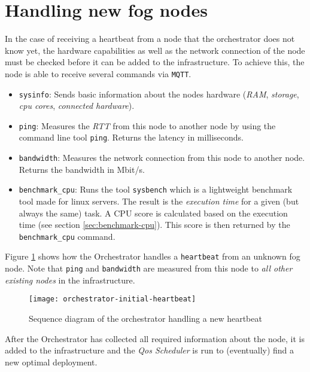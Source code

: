 \section{Handling new fog nodes\label{sec:handling-new-fog-nodes}}

In the case of receiving a heartbeat from a node that the orchestrator does not know yet, the hardware capabilities as well as the network connection of the node must be checked before it can be added to the infrastructure. To achieve this, the node is able to receive several commands via \texttt{MQTT}.

\begin{itemize}
    \item \texttt{sysinfo}: Sends basic information about the nodes hardware (\textit{RAM}, \textit{storage}, \textit{cpu cores}, \textit{connected hardware}).
    \item \texttt{ping}: Measures the \textit{RTT} from this node to another node by using the command line tool \texttt{ping}. Returns the latency in milliseconds.
    \item \texttt{bandwidth}: Measures the network connection from this node to another node. Returns the bandwidth in Mbit/s.
    \item \texttt{benchmark\_cpu}: Runs the tool \texttt{sysbench} which is a lightweight benchmark tool made for linux servers. The result is the \textit{execution time} for a given (but always the same) task. A CPU score is calculated based on the execution time (see section \ref{sec:benchmark-cpu}). This score is then returned by the \texttt{benchmark\_cpu} command.
\end{itemize}

Figure \ref{fig:orchestrator-initial-heartbeat} shows how the Orchestrator handles a \texttt{heartbeat} from an unknown fog node. Note that \texttt{ping} and \texttt{bandwidth} are measured from this node to \textit{all other existing nodes} in the infrastructure.

\begin{figure}[htb]
    \centering
    \texttt{[image: orchestrator-initial-heartbeat]}
    \caption{Sequence diagram of the orchestrator handling a new heartbeat}
    \label{fig:orchestrator-initial-heartbeat}
\end{figure}

After the Orchestrator has collected all required information about the node, it is added to the infrastructure and the \textit{Qos Scheduler} is run to (eventually) find a new optimal deployment.

